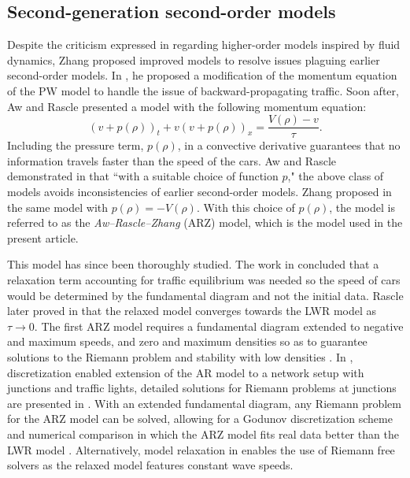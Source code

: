 \documentclass[preprint]{elsarticle}
\begin{document}
\subsection{Second-generation second-order models}
Despite the criticism expressed in \cite{Dag_requiem} regarding higher-order models inspired by fluid dynamics, Zhang proposed improved models to resolve issues plaguing earlier second-order models. In \cite{Zhang1998}, he proposed a modification of the momentum equation of the PW model to handle the issue of backward-propagating traffic.
Soon after, Aw and Rascle \cite{AR} presented a model with the following momentum equation:
\begin{equation} \label{ARZEq}
(v+p(\rho))_t+v(v+p(\rho))_x=\frac{V(\rho)-v}{\tau}.
\end{equation}
Including the pressure term, $p(\rho)$, in a convective derivative guarantees that no information travels faster than the speed of the cars. Aw and Rascle demonstrated in \cite{AR} that ``with a suitable choice of function $p$," the above class of models avoids inconsistencies of earlier second-order models. Zhang proposed in \cite{Z} the same model with $p(\rho) = -V(\rho)$. With this choice of $p(\rho)$, the model is referred to as the \textit{Aw--Rascle--Zhang} (ARZ) model, which is the model used in the present article.

This model has since been thoroughly studied. The work in
\cite{AR} concluded that a relaxation term accounting for traffic
equilibrium was needed so the speed of cars would be determined by
the fundamental diagram and not the initial data. Rascle later proved in \cite{R_improved} that the relaxed model converges towards the LWR model as $\tau \rightarrow 0$. The first ARZ model requires a fundamental diagram extended to negative and maximum speeds, and zero and maximum densities so as to guarantee
solutions to the Riemann problem and stability with low densities \cite{lebacque2007}. In \cite{HybridLagrangian2007}, 
discretization enabled extension of the AR model to a network setup with junctions and traffic lights, detailed solutions for Riemann problems at junctions are presented in \cite{garavello2006traffic}. With an extended fundamental diagram, any Riemann problem for the ARZ model can be solved, allowing for a Godunov discretization scheme and numerical comparison
in which the ARZ model fits real data better than the LWR model \cite{GodunovARZ}. Alternatively, model relaxation in \cite{Delis2014318} enables the use of Riemann free solvers as the relaxed model features constant wave speeds.
\end{document}

